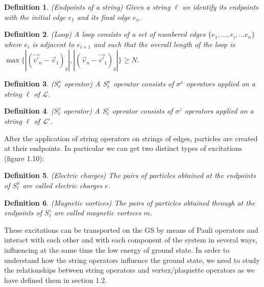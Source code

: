 \documentclass{Configuration_Files/PoliMi3i_thesis}
\newtheorem{definition}{Definition}[chapter]
\begin{document}
\begin{definition}(Endpoints of a string)
	Given a string $\ell$ we identify its endpoints with the initial edge $e_1$ and its final edge $e_n$.
\end{definition}

\begin{definition}(Loop)
	A loop consists of a set of numbered edges $\{e_1, \dots, e_i, \dots e_n\}$ where $e_i$ is adjacent to $e_{i+1}$ and such that the overall length of the loop is $\max \{ |(\vec{v'}_n-\vec{v}_1)_y|, |(\vec{v}_n-\vec{v'}_1)_y| \} \ge N$.
\end{definition}

\begin{definition}($S^x_\ell$ operator)
	A $S^x_\ell$ operator consists of $\sigma^x$ operators applied on a string $\ell$ of $\mathcal{L}$.
\end{definition}

\begin{definition}($S^z_\ell$ operator)
	A $S^z_\ell$ operator consists of $\sigma^z$ operators applied on a string $\ell$ of $\mathcal{L'}$.
\end{definition}

After the application of string operators on strings of edges, particles are created at their endpoints. In particular we can get two distinct types of excitations (figure 1.10):

\begin{definition}(Electric charges)
	The pairs of particles obtained at the endpoints of $S^x_\ell$ are called electric charges $e$.
\end{definition}

\begin{definition}(Magnetic vortices)
	The pairs of particles obtained through at the endpoints of $S^z_\ell$ are called magnetic vorteces $m$.
\end{definition}

These excitations can be transported on the GS by means of Pauli operators and interact with each other and with each component of the system in several ways, influencing at the same time the low energy of ground state.\newline
In order to understand how the string operators influence the ground state, we need to study the relationships between string operators and vertex/plaquette operators as we have defined them in section 1.2.\newline
\end{document}
